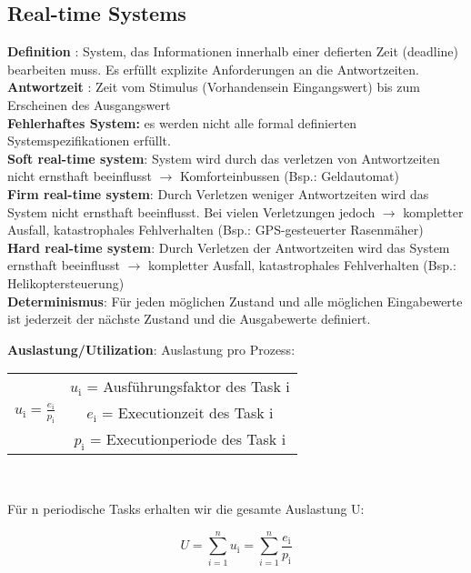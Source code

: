 \subsection{Real-time Systems}
\textbf{Definition} : System, das Informationen innerhalb einer defierten Zeit
(deadline) bearbeiten muss. Es erfüllt explizite Anforderungen an die
Antwortzeiten.\\
\textbf{Antwortzeit} : Zeit vom Stimulus (Vorhandensein
Eingangswert) bis zum Erscheinen des Ausgangswert\\
\textbf{Fehlerhaftes System:} es werden nicht alle formal definierten Systemspezifikationen erfüllt.\\
\textbf{Soft real-time system}: System wird durch das verletzen von
Antwortzeiten nicht ernsthaft beeinflusst $\rightarrow$ Komforteinbussen (Bsp.:
Geldautomat)\\
\textbf{Firm real-time system}: Durch Verletzen weniger Antwortzeiten wird das
System nicht ernsthaft beeinflusst. Bei vielen Verletzungen jedoch $\rightarrow$
kompletter Ausfall, katastrophales Fehlverhalten (Bsp.: GPS-gesteuerter
Rasenmäher)\\
\textbf{Hard real-time system}: Durch Verletzen der Antwortzeiten wird das
System ernsthaft beeinflusst $\rightarrow$ kompletter Ausfall, katastrophales
Fehlverhalten (Bsp.: Helikoptersteuerung)\\
\textbf{Determinismus}: Für jeden möglichen Zustand und alle möglichen
Eingabewerte ist jederzeit der nächste Zustand und die Ausgabewerte definiert.

\begin{multicols}{2}
\textbf{Auslastung/Utilization}: 
Auslastung pro Prozess:
\begin{center}  
\begin{tabular}{c c}
& $u_\text{i}$ = Ausführungsfaktor des Task i\\
$u_\text{i} = \frac{e_\text{i}}{p_\text{i}}$&$e_\text{i}$ = Executionzeit des
Task i\\
& $p_\text{i}$ = Executionperiode des Task i
\end{tabular}\\
\end{center}

\columnbreak

Für n periodische Tasks erhalten wir die gesamte Auslastung U: 
\begin{center}
\begin{equation}
U = \sum_{i=1}^{n}u_\text{i} = \sum_{i=1}^{n}\frac{e_\text{i}}{p_\text{i}}
\end{equation}
\end{center}
\end{multicols}

